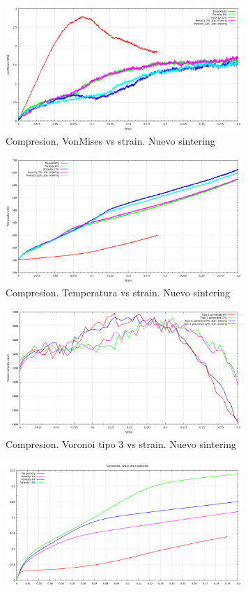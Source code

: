 \documentclass[10pt, oneside]{article} %
\begin{document}
\begin{figure}[H]
\centering
\includegraphics[width=9cm]{Figures/Porosidad/Porosidad_newSinter_vm.png}
\caption{Compresion. VonMises vs strain. Nuevo sintering}
\end{figure}

\begin{figure}[H]
\centering
\includegraphics[width=9cm]{Figures/Porosidad/Porosidad_newSinter_temp.png}
\caption{Compresion. Temperatura vs strain. Nuevo sintering}
\end{figure}

\begin{figure}[H]
\centering
\includegraphics[width=9cm]{Figures/Porosidad/Porosidad_newSinter_voronoi3.png}
\caption{Compresion. Voronoi tipo 3 vs strain. Nuevo sintering}
\end{figure}

\begin{figure}[H]
\centering
\includegraphics[width=9cm]{Figures/Porosidad/Porosidad_ss_1.png}
\caption{}
\end{figure}
\end{document}
